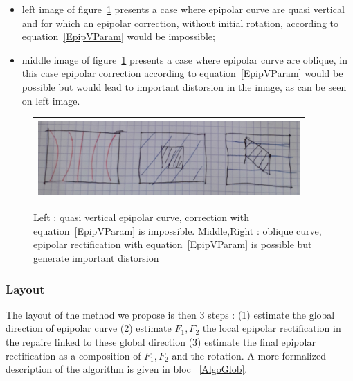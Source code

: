 \documentclass{ipol}
\begin{document}
\begin{itemize}
   \item left image of figure~\ref{ReqOrient} presents a case where epipolar curve are quasi vertical
         and for which an epipolar correction, without initial rotation,  
          according to equation~\ref{EpipVParam} would be impossible;
   \item middle image of figure~\ref{ReqOrient} presents a case where epipolar curve are oblique,
         in this case epipolar correction according to equation~\ref{EpipVParam} would be possible
         but would lead to important distorsion in the image, as can be seen on left image.
\end{itemize}




\begin{figure}
\centering
\begin{tabular}{||c||}
 \hline \hline
\includegraphics[width=10cm]{FIGS/EpipReqOrient.jpg}
 \\ \hline \hline
\end{tabular}
\caption{Left : quasi vertical epipolar curve, correction with equation~\ref{EpipVParam} is impossible. 
         Middle,Right  : oblique curve, epipolar rectification  with equation~\ref{EpipVParam} is possible
         but generate important distorsion}
\label{ReqOrient}
\end{figure}





\subsubsection{Layout}

The layout of the method we propose is then $3$ steps : (1) estimate the global 
direction of epipolar curve (2) estimate $F_1,F_2$ the local epipolar rectification
 in the repaire linked to these global direction (3)  estimate the final
epipolar rectification as a composition of $F_1,F_2$ and the rotation.
A more formalized description of the algorithm is given in bloc ~\ref{AlgoGlob}.
\end{document}
